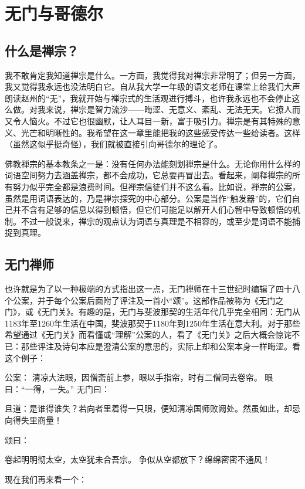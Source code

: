 
\chapter{无门与哥德尔}

\section{什么是禅宗？}

我不敢肯定我知道禅宗是什么。一方面，我觉得我对禅宗非常明了；但另一方面，我又觉得我永远也没法明白它。自从我大学一年级的语文老师在课堂上给我们大声朗读赵州的“无”，我就开始与禅宗式的生活观进行搏斗，也许我永远也不会停止这么做。对我来说，禅宗是智力流沙——晦涩、无意义、紊乱、无法无天。它撩人而又令人恼火。不过它也很幽默，让人耳目一新，富于吸引力。禅宗是有其特殊的意义、光芒和明晰性的。我希望在这一章里能把我的这些感受传达一些给读者。这样（虽然这似乎挺奇怪），我们就被直接引向哥德尔的理论了。

佛教禅宗的基本教条之一是：没有任何办法能刻划禅宗是什么。无论你用什么样的词语空间努力去涵盖禅宗，都不会成功，它总要再冒出去。看起来，阐释禅宗的所有努力似乎完全都是浪费时间。但禅宗信徒们并不这么看。比如说，禅宗的公案，虽然是用词语表达的，乃是禅宗探究的中心部分。公案是当作“触发器”的，它们自己并不含有足够的信息以得到顿悟，但它们可能足以解开人们心智中导致顿悟的机制。不过一般说来，禅宗的观点认为词语与真理是不相容的，或至少是词语不能捕捉到真理。

\section{无门禅师}

也许就是为了以一种极端的方式指出这一点，无门禅师在十三世纪时编辑了四十八个公案，并于每个公案后面附了评注及一首小“颂”。这部作品被称为《无门之门》，或《无门关》。有趣的是，无门与斐波那契的生活年代几乎完全相同：无门从1183年至1260年生活在中国，斐波那契于1180年到1250年生活在意大利。对于那些希望通过《无门关》而看懂或“理解”公案的人，看了《无门关》之后大概会惊诧不已：那些评注及诗句本应是澄清公案的意思的，实际上却和公案本身一样晦涩。看这个例子：

\begin{zenkoan}
公案：
清凉大法眼，因僧斋前上参，眼以手指帘，时有二僧同去卷帘。
眼曰：“一得，一失。”
无门曰：
\begin{zenkoan}
且道：是谁得谁失？若向者里着得一只眼，便知清凉国师败阙处。然虽如此，却忌向得失里商量！
\end{zenkoan}
颂曰：
\begin{zenkoan}
卷起明明彻太空，太空犹未合吾宗。
争似从空都放下？绵绵密密不通风！
\end{zenkoan}
\end{zenkoan}
现在我们再来看一个：

